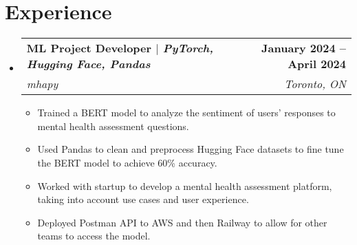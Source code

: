 \documentclass[letterpaper,11pt]{article}
\makeatletter
\newcommand{\resumeItem}[1]{
  \item\small{
    {#1 \vspace{-2pt}}
  }
}
\newcommand{\resumeSubheading}[4]{
  \vspace{-2pt}\item
    \begin{tabular*}{1.0\textwidth}[t]{l@{\extracolsep{\fill}}r}
      \textbf{#1} & \textbf{\small #2} \\
      \textit{\small#3} & \textit{\small #4} \\
    \end{tabular*}\vspace{-7pt}
}
\newcommand{\resumeSubHeadingListStart}{\begin{itemize}[leftmargin=0.0in, label={}]}
\newcommand{\resumeSubHeadingListEnd}{\end{itemize}}
\newcommand{\resumeItemListStart}{\begin{itemize}}
\newcommand{\resumeItemListEnd}{\end{itemize}\vspace{-5pt}}
\makeatother
\begin{document}
%
\section{Experience}
  \resumeSubHeadingListStart
    \resumeSubheading
    {\textbf{ML Project Developer} $|$ \emph{PyTorch, Hugging Face, Pandas}}{January 2024 -- April 2024}
      {mhapy}{Toronto, ON}
      \resumeItemListStart
      \resumeItem{Trained a BERT model to analyze the sentiment of users' responses to mental health assessment questions.}
      \resumeItem{Used Pandas to clean and preprocess Hugging Face datasets to fine tune the BERT model to achieve 60\% accuracy.}
      \resumeItem{Worked with startup to develop a mental health assessment platform, taking into account use cases and user experience.}
      \resumeItem{Deployed Postman API to AWS and then Railway to allow for other teams to access the model.}        \resumeItemListEnd
  \resumeSubHeadingListEnd
\vspace{-20pt}

\end{document}
